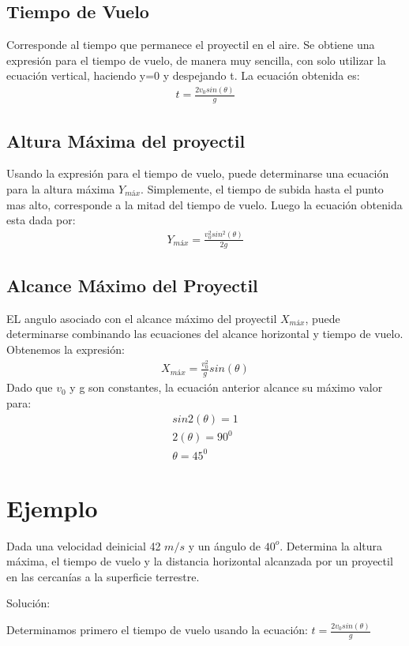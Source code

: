 \documentclass[12pt,a4paper]{article}
\begin{document}
\subsection{Tiempo de Vuelo}
Corresponde al tiempo que permanece el proyectil en el aire. Se obtiene una expresión para el tiempo de vuelo, de manera muy sencilla, con solo utilizar la ecuación vertical, haciendo y=0 y despejando t. La ecuación obtenida es:
\begin{eqnarray}
t=\frac{2v_{0}sin(\theta)}{g}
\end{eqnarray}
\subsection{Altura Máxima del proyectil}
Usando la expresión para el tiempo de vuelo, puede determinarse una ecuación para la altura máxima $Y_{máx}$. Simplemente, el tiempo de subida hasta el punto mas alto, corresponde a la mitad del tiempo de vuelo. Luego la ecuación obtenida esta dada por:
\begin{eqnarray}
Y_{máx}=\frac{v^{2}_{0}sin^{2}(\theta)}{2g} 
\end{eqnarray}
\subsection{Alcance Máximo del Proyectil}
EL angulo asociado con el alcance máximo del proyectil $X_{máx}$, puede determinarse combinando las ecuaciones del alcance horizontal y tiempo de vuelo. Obtenemos la expresión:
\begin{eqnarray}
X_{máx}=\frac{v^{2}_{0}}{g}sin(\theta)
\end{eqnarray}
Dado que $v_{0}$ y g son constantes, la ecuación anterior alcance su máximo valor para:
\begin{eqnarray}
sin2(\theta)=1 \nonumber\\
2(\theta) = 90^{0} \nonumber\\
\theta = 45^{0}
\end{eqnarray}
\section{Ejemplo}
Dada una velocidad deinicial 42 $m/s$ y un ángulo de $40^{o}$. Determina la altura máxima, el tiempo de vuelo y la distancia horizontal alcanzada por un proyectil en las cercanías a la superficie terrestre.

Solución:

Determinamos primero el tiempo de vuelo usando la ecuación: $t=\frac{2v_{0}sin(\theta)}{g}$
\end{document}
